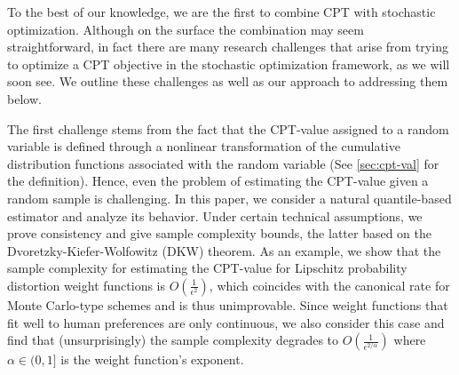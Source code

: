 To the  best of our knowledge, we are the first to combine CPT with stochastic optimization. Although on the surface the combination may seem straightforward, in fact there are many research challenges that arise from trying to optimize a CPT objective in the stochastic optimization framework, as we will soon see. 
We outline these challenges as well as our approach to addressing them below. 

The first challenge stems from the fact that the CPT-value assigned to a random variable is defined through a nonlinear transformation of the cumulative distribution functions associated with the random variable (See \cref{sec:cpt-val} for the definition). 
Hence, even the problem of estimating the CPT-value given a random sample is challenging.
In this paper, we consider a natural quantile-based estimator and analyze its behavior.
Under certain technical assumptions, we prove consistency and give sample complexity bounds, the latter based on the
 Dvoretzky-Kiefer-Wolfowitz (DKW) theorem.
As an example, we show that the sample complexity for estimating the CPT-value 
for Lipschitz probability distortion weight functions is  $O\left(\frac1{\epsilon^2}\right)$, which coincides with the canonical rate for Monte Carlo-type schemes and is thus unimprovable. Since weight functions that fit well to human preferences are only  \holder continuous, we also consider this case and find that (unsurprisingly) the sample complexity  degrades to $O\left(\frac1{\epsilon^{2/\alpha}}\right)$ where $\alpha\in (0,1]$ is the weight function's \holder exponent.

